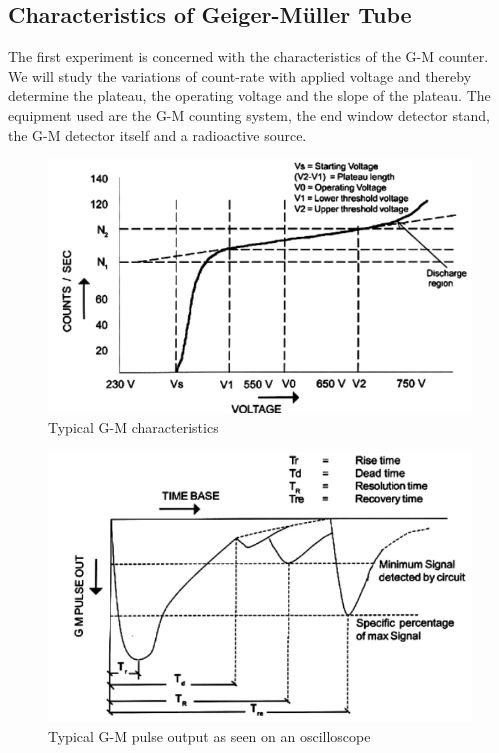 \documentclass[%
 reprint,
nofootinbib,
 amsmath,amssymb,
 aps,
floatfix,
]{revtex4-2}
\begin{document}
    \subsection{Characteristics of Geiger-M\"{u}ller Tube}
    \label{sec:GMtubecharac}
        The first experiment is concerned with the characteristics of the G-M counter. We will study the variations of count-rate with applied voltage and thereby determine the plateau, the operating voltage and the slope of the plateau. The equipment used are the G-M counting system, the end window detector stand, the G-M detector itself and a radioactive source.
        \begin{figure}
            \centering
            \includegraphics[scale = 0.63]{Figures/typicalgmcharac.png}
            \caption{Typical G-M characteristics}
            \label{fig:typicalGM}
        \end{figure}
        \begin{figure}
            \centering
            \includegraphics[scale = 0.63]{Figures/gmpulseout.png}
            \caption{Typical G-M pulse output as seen on an oscilloscope}
            \label{fig:gmpulseout}
        \end{figure}
\end{document}
